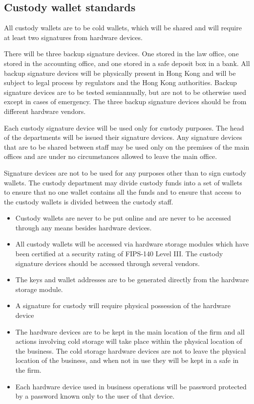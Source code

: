 \subsection{Custody wallet standards}

All custody wallets are to be cold wallets, which will be shared and
will require at least two signatures from hardware devices.

There will be three backup signature devices.  One stored in the law
office, one stored in the accounting office, and one stored in a
safe deposit box in a bank.  All backup signature devices will be
physically present in Hong Kong and will be subject to legal process
by regulators and the Hong Kong authorities.  Backup signature devices
are to be tested semiannually, but are not to be otherwise used except
in cases of emergency.  The three backup signature devices should be
from different hardware vendors.

Each custody signature device will be used only for custody purposes.
The head of the departments will be issued their signature
devices.  Any signature devices that are to be shared between staff
may be used only on the premises of the main offices and are under no
circumstances allowed to leave the main office.

Signature devices are not to be used for any purposes other than to
sign custody wallets.  The custody department may divide custody funds
into a set of wallets to ensure that no one wallet contains all the
funds and to ensure that access to the custody wallets is divided
between the custody staff.

\begin{itemize}
  \item Custody wallets are never to be put online and are never to be
    accessed through any means besides hardware devices.
  \item All custody wallets will be accessed via hardware storage
    modules which have been certified at a security rating of
    FIPS-140 Level III.  The custody signature devices should be
    accessed through several vendors.
 \item The keys and wallet addresses are to be generated directly from
   the hardware storage module.
 \item A signature for custody will require physical possession
   of the hardware device
 \item The hardware devices are to be kept in the main location of the
   firm and all actions involving cold storage will take place within
   the physical location of the business.  The cold storage hardware
   devices are not to leave the physical location of the business, and
   when not in use they will be kept in a safe in the firm.
 \item Each hardware device used in business operations will be
   password protected by a password known only to the user of that
   device.
\end{itemize}

